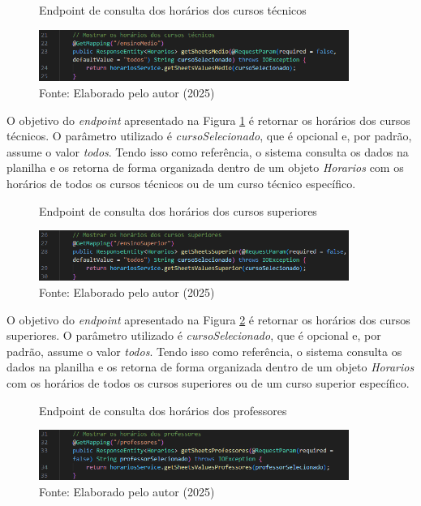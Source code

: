 \begin{itemize}
    \begin{figure}[htb]
        \centering
        \caption{Endpoint de consulta dos horários dos cursos técnicos}
        \includegraphics[width=0.9\textwidth]{Figuras/back-3.png}
        \caption*{Fonte: Elaborado pelo autor (2025)}
        \label{fig_back_3}
    \end{figure}

    O objetivo do \textit{endpoint} apresentado na Figura \ref{fig_back_3} é retornar os horários dos cursos técnicos. O parâmetro utilizado é \textit{cursoSelecionado}, que é opcional e, por padrão, assume o valor \textit{todos}. Tendo isso como referência, o sistema consulta os dados na planilha e os retorna de forma organizada dentro de um objeto \textit{Horarios} com os horários de todos os cursos técnicos ou de um curso técnico específico.

    \begin{figure}[htb]
        \centering
        \caption{Endpoint de consulta dos horários dos cursos superiores}
        \includegraphics[width=0.9\textwidth]{Figuras/back-4.png}
        \caption*{Fonte: Elaborado pelo autor (2025)}
        \label{fig_back_4}
    \end{figure}

    O objetivo do \textit{endpoint} apresentado na Figura \ref{fig_back_4} é retornar os horários dos cursos superiores. O parâmetro utilizado é \textit{cursoSelecionado}, que é opcional e, por padrão, assume o valor \textit{todos}. Tendo isso como referência, o sistema consulta os dados na planilha e os retorna de forma organizada dentro de um objeto \textit{Horarios} com os horários de todos os cursos superiores ou de um curso superior específico.

    \begin{figure}[htb]
        \centering
        \caption{Endpoint de consulta dos horários dos professores}
        \includegraphics[width=0.9\textwidth]{Figuras/back-5.png}
        \caption*{Fonte: Elaborado pelo autor (2025)}
        \label{fig_back_5}
    \end{figure}


\end{itemize}

